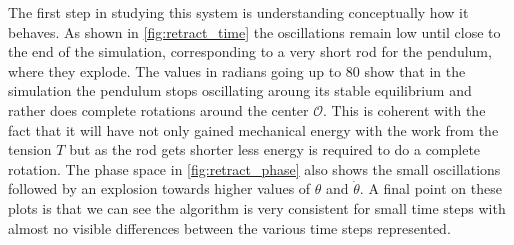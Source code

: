 The first step in studying this system is understanding conceptually how it behaves. As shown in \autoref{fig:retract_time} the oscillations remain low until close to the end of the simulation, corresponding to a very short rod for the pendulum, where they explode. The values in radians going up to 80 show that in the simulation the pendulum stops oscillating aroung its stable equilibrium and rather does complete rotations around the center $\mathcal{O}$. This is coherent with the fact that it will have not only gained mechanical energy with the work from the tension $T$ but as the rod gets shorter less energy is required to do a complete rotation. The phase space in \autoref{fig:retract_phase} also shows the small oscillations followed by an explosion towards higher values of $\theta$ and $\dot\theta$. A final point on these plots is that we can see the algorithm is very consistent for small time steps with almost no visible differences between the various time steps represented.
